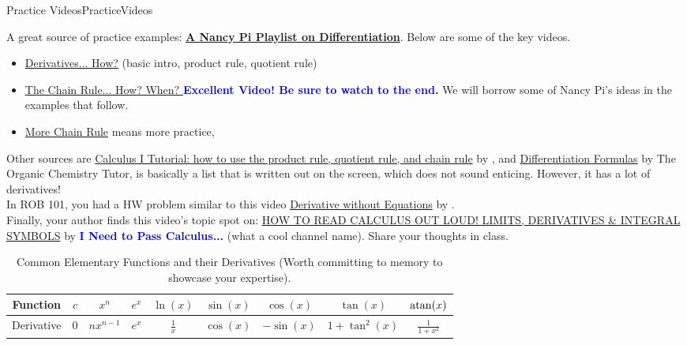 \Qed

\vspace*{.2cm}

\begin{factColor}{Practice Videos}{PracticeVideos}

A great source of practice examples: \href{https://www.youtube.com/results?search_query=differntiation+nancy+pi}{\bf A Nancy Pi Playlist on Differentiation}. Below are some of the key videos.
    \begin{itemize}
         \item \href{https://youtu.be/QqF3i1pnyzU}{Derivatives... How?} (basic intro, product rule, quotient rule)
         \item \href{https://youtu.be/H-ybCx8gt-8}{The Chain Rule... How? When? } \textcolor{blue}{\bf Excellent Video! Be sure to watch to the end.} We will borrow some of Nancy Pi's ideas in the examples that follow.

         \item \href{https://youtu.be/U_qp0isxQYU}{More Chain Rule} means more practice,

    \end{itemize}   
Other sources are \href{https://youtu.be/ahwtdXvlp9w}{Calculus I Tutorial: how to use the product rule, quotient rule, and chain rule} by \bprp, and \href{https://youtu.be/AdLAkD-r9Rs}{Differentiation Formulas} by The Organic Chemistry Tutor, is basically a list that is written out on the screen, which does not sound enticing. However, it has a lot of derivatives!  \\

In ROB 101, you had a HW problem similar to this video \href{https://www.youtube.com/shorts/QW9T4ZqfTww}{Derivative without Equations} by \bprp.\\

Finally, your author finds this video's topic spot on: \href{https://youtu.be/S-5LFiuieCE}{HOW TO READ CALCULUS OUT LOUD! LIMITS, DERIVATIVES \& INTEGRAL SYMBOLS} by 
\textcolor{blue}{\bf I Need to Pass Calculus...} (what a cool channel name). Share your thoughts in class.
    
\end{factColor}

\vspace*{.2cm}

\renewcommand{\arraystretch}{1.5}
\begin{table}[htb]
\centering
\begin{tabular}{|c |c|c|c|c|c|c|c|c|}
\hline
Function & $c$ & $x^n$ & $e^x$ & $\ln(x)$ & $\sin(x)$ & $\cos(x)$ & $\tan(x)$ & $\mathrm{atan}(x)$\\
\hline
Derivative & $0$ & $nx^{n - 1}$ & $e^x$ & $\frac{1}{x}$ & $\cos(x)$ & $-\sin(x)$ & $1 + \tan^2(x)$ & $\frac{1}{1 + x^2}$\\
\hline
\end{tabular}
\caption{Common Elementary Functions and their Derivatives (Worth committing to memory to showcase your expertise).}
\label{tab:CommonFunctionsAndTheirDerivatives}
\end{table}

